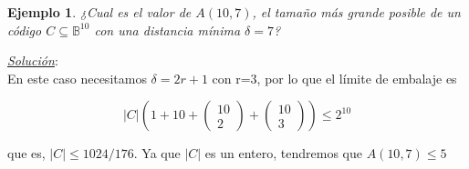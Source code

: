 \documentclass{beamer}
\theoremstyle{plain}
\theoremstyle{example}
\theoremstyle{example}
\newtheorem{ejemplo} [Ejemplo] {Ejemplo}
\begin{document}
\begin{frame}  \small  

\begin{ejemplo}
¿Cual es el valor de $A(10, 7)$, el tamaño más grande posible de un código $C \subseteq \mathbb{B}^{10}$ con una distancia mínima $\delta = 7$?
\end{ejemplo}



\textit{\underline{Solución}}:\\
\vspace{0.3cm}
En este caso necesitamos $\delta = 2r+1$ con r=3, por lo que el límite de embalaje es

\[
 |C| \left( 1+10+ 
            \left( \begin{array}{c}
                  10 \\
                  2       
           			\end{array}
    		\right) + 
    		\left( \begin{array}{c}
                  10  \\
                  3      
           			\end{array}
    		\right)    		
    \right)    	\leq 2^{10}    		
\]

que es, $|C| \leq 1024/176$. Ya que $|C|$  es un entero, tendremos que $A(10, 7) \leq 5$


\end{frame} 
\end{document}
